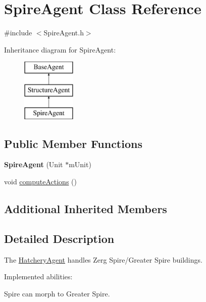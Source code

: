 \hypertarget{class_spire_agent}{\section{Spire\-Agent Class Reference}
\label{class_spire_agent}
}


{\ttfamily \#include $<$Spire\-Agent.\-h$>$}

Inheritance diagram for Spire\-Agent\-:\begin{figure}[H]
\begin{center}
\leavevmode
\includegraphics[height=3.000000cm]{class_spire_agent}
\end{center}
\end{figure}
\subsection*{Public Member Functions}
\begin{DoxyCompactItemize}
\item 
\hypertarget{class_spire_agent_ad98f8708dd0e7bea76cdf41e010bfca1}{{\bfseries Spire\-Agent} (Unit $\ast$m\-Unit)}\label{class_spire_agent_ad98f8708dd0e7bea76cdf41e010bfca1}

\item 
void \hyperlink{class_spire_agent_a6d8924d36f4c6216caf14d4d66258160}{compute\-Actions} ()
\end{DoxyCompactItemize}
\subsection*{Additional Inherited Members}


\subsection{Detailed Description}
The \hyperlink{class_hatchery_agent}{Hatchery\-Agent} handles Zerg Spire/\-Greater Spire buildings.

Implemented abilities\-:
\begin{DoxyItemize}
\item Spire can morph to Greater Spire.
\end{DoxyItemize}

